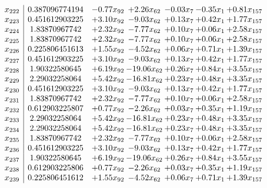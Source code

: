 \documentclass[8pt]{article}
\begin{document}
\[\begin{array}{c| c c@{\hskip 2pt} c@{\hskip 2pt} c@{\hskip 2pt} c@{\hskip 2pt} c@{\hskip 2pt} }
 x_{222}   &  0.387096774194 & -0.77 x_{92} & +  2.26 x_{62} & -0.03 x_{7} & -0.35 x_{1} & +  0.81 x_{157}\\
 x_{223}   &  0.451612903225 & +  3.10 x_{92} & -9.03 x_{62} & +  0.13 x_{7} & +  0.42 x_{1} & +  1.77 x_{157}\\
 x_{224}   &  1.83870967742 & +  2.32 x_{92} & -7.77 x_{62} & +  0.10 x_{7} & +  0.06 x_{1} & +  2.58 x_{157}\\
 x_{225}   &  1.83870967742 & +  2.32 x_{92} & -7.77 x_{62} & +  0.10 x_{7} & +  0.06 x_{1} & +  2.58 x_{157}\\
 x_{226}   &  0.225806451613 & +  1.55 x_{92} & -4.52 x_{62} & +  0.06 x_{7} & +  0.71 x_{1} & +  1.39 x_{157}\\
 x_{227}   &  0.451612903225 & +  3.10 x_{92} & -9.03 x_{62} & +  0.13 x_{7} & +  0.42 x_{1} & +  1.77 x_{157}\\
 x_{228}   &  1.90322580645 & +  6.19 x_{92} & -19.06 x_{62} & +  0.26 x_{7} & +  0.84 x_{1} & +  3.55 x_{157}\\
 x_{229}   &  2.29032258064 & +  5.42 x_{92} & -16.81 x_{62} & +  0.23 x_{7} & +  0.48 x_{1} & +  3.35 x_{157}\\
 x_{230}   &  0.451612903225 & +  3.10 x_{92} & -9.03 x_{62} & +  0.13 x_{7} & +  0.42 x_{1} & +  1.77 x_{157}\\
 x_{231}   &  1.83870967742 & +  2.32 x_{92} & -7.77 x_{62} & +  0.10 x_{7} & +  0.06 x_{1} & +  2.58 x_{157}\\
 x_{232}   &  0.612903225807 & +  0.77 x_{92} & -2.26 x_{62} & +  0.03 x_{7} & +  0.35 x_{1} & +  1.19 x_{157}\\
 x_{233}   &  2.29032258064 & +  5.42 x_{92} & -16.81 x_{62} & +  0.23 x_{7} & +  0.48 x_{1} & +  3.35 x_{157}\\
 x_{234}   &  2.29032258064 & +  5.42 x_{92} & -16.81 x_{62} & +  0.23 x_{7} & +  0.48 x_{1} & +  3.35 x_{157}\\
 x_{235}   &  1.83870967742 & +  2.32 x_{92} & -7.77 x_{62} & +  0.10 x_{7} & +  0.06 x_{1} & +  2.58 x_{157}\\
 x_{236}   &  0.451612903225 & +  3.10 x_{92} & -9.03 x_{62} & +  0.13 x_{7} & +  0.42 x_{1} & +  1.77 x_{157}\\
 x_{237}   &  1.90322580645 & +  6.19 x_{92} & -19.06 x_{62} & +  0.26 x_{7} & +  0.84 x_{1} & +  3.55 x_{157}\\
 x_{238}   &  0.612903225806 & +  0.77 x_{92} & -2.26 x_{62} & +  0.03 x_{7} & +  0.35 x_{1} & +  1.19 x_{157}\\
 x_{239}   &  0.225806451612 & +  1.55 x_{92} & -4.52 x_{62} & +  0.06 x_{7} & +  0.71 x_{1} & +  1.39 x_{157}\\

\end{array}\]
\end{document}
